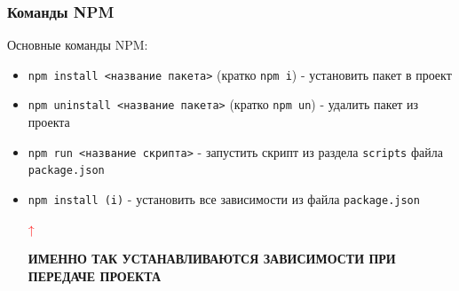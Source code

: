 \documentclass[aspectratio=169]{beamer}
\begin{document}

  \begin{frame}
    \frametitle{Команды NPM}

    \begin{center}
      \large Основные команды NPM:
      
    \end{center}
    \begin{itemize}
    \item \texttt{npm install <название пакета>} (кратко \texttt{npm i}) - установить пакет в проект
    \item \texttt{npm uninstall <название пакета>} (кратко \texttt{npm un}) - удалить пакет из проекта
    \item \texttt{npm run <название скрипта>} - запустить скрипт из раздела \texttt{scripts} файла \texttt{package.json}
      
      \bigskip
      
    \item \texttt{npm install (i)} - установить все зависимости из файла \texttt{package.json}
      \begin{center}
        \textcolor{red}{\huge{↑}}
      \end{center}
      \begin{center}
      \textbf{ИМЕННО ТАК УСТАНАВЛИВАЮТСЯ ЗАВИСИМОСТИ ПРИ ПЕРЕДАЧЕ ПРОЕКТА}
      \end{center}
    \end{itemize}
  \end{frame}
  
\end{document}
